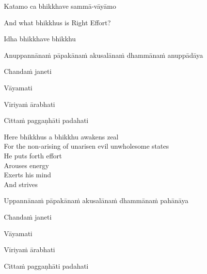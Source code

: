 Katamo ca bhikkhave sammā-vāyāmo

\begin{english}
  And what bhikkhus is Right Effort?
\end{english}

\begin{pali-hang}
Idha bhikkhave bhikkhu
\end{pali-hang}
\begin{pali-hang-together}
Anuppannānaṁ pāpakānaṁ akusalānaṁ dhammānaṁ anuppādāya
\end{pali-hang-together}
\begin{pali-hang-together}
Chandaṁ janeti
\end{pali-hang-together}
\begin{pali-hang-together}
Vāyamati
\end{pali-hang-together}
\begin{pali-hang-together}
Vīriyaṁ ārabhati
\end{pali-hang-together}
\begin{pali-hang-together}
Cittaṁ paggaṇhāti padahati
\end{pali-hang-together}


\begin{english-verses}
  Here bhikkhus a bhikkhu awakens zeal\\
  For the non-arising of unarisen evil unwholesome states\\
  He puts forth effort\\
  Arouses energy\\
  Exerts his mind\\
  And strives
\end{english-verses}

\ifbfive\enlargethispage{1\baselineskip}\fi
\ifninebythirteen\clearpage\fi

\begin{pali-hang}
Uppannānaṁ pāpakānaṁ akusalānaṁ dhammānaṁ pahānāya
\end{pali-hang}
\begin{pali-hang-together}
Chandaṁ janeti
\end{pali-hang-together}
\begin{pali-hang-together}
Vāyamati
\end{pali-hang-together}
\begin{pali-hang-together}
Vīriyaṁ ārabhati
\end{pali-hang-together}
\begin{pali-hang-together}
Cittaṁ paggaṇhāti padahati
\end{pali-hang-together}

